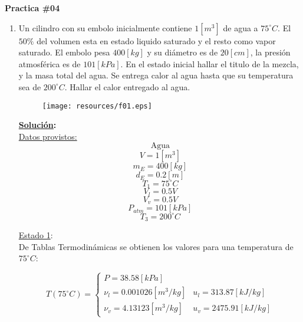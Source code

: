 \documentclass[letter,11pt]{article}
\begin{document}
\begin{center}
    {\Large \bf{Practica \#04}}
\end{center}

\begin{enumerate}
\item Un cilindro con su embolo inicialmente contiene $1[m^3]$ de agua a
$75^\circ C$. El $50\%$ del volumen esta en estado liquido saturado y el resto
como vapor saturado. El embolo pesa $400[kg]$ y su diámetro es de $20[cm]$, la
presión atmosférica es de $101[kPa]$. En el estado inicial hallar el titulo de
la mezcla, y la masa total del agua. Se entrega calor al agua hasta que su
temperatura sea de $200^\circ C$. Hallar el calor entregado al agua.

\begin{figure}[H]
\centering
\texttt{[image: resources/f01.eps]}
\end{figure}

\textbf{\underline{Solución}:} \\

\underline{Datos provistos:}
\begin{equation*}
    \text{Agua}
\end{equation*}
\begin{equation*}
    V = 1[m^3]
\end{equation*}
\begin{equation*}
    m_E=400[kg]
\end{equation*}
\begin{equation*}
    d_E=0.2[m]
\end{equation*}
\begin{equation*}
    T_1=75^\circ C
\end{equation*}
\begin{equation*}
    V_l=0.5V
\end{equation*}
\begin{equation*}
    V_v=0.5V
\end{equation*}
\begin{equation*}
    P_{atm}=101[kPa]
\end{equation*}
\begin{equation*}
    T_3=200^\circ C
\end{equation*}

\underline{Estado 1}: \\
De Tablas Termodinámicas se obtienen los valores para una temperatura de
$75^\circ C$:

\begin{equation*}
    T(75^\circ C) = \begin{cases}
        P = 38.58[kPa] \\
        \nu_l = 0.001026[m^3/kg] & u_l = 313.87[kJ/kg] \\
        \nu_v = 4.13123[m^3/kg]  & u_v = 2475.91[kJ/kg]
    \end{cases}
\end{equation*}


\end{enumerate}
\end{document}

